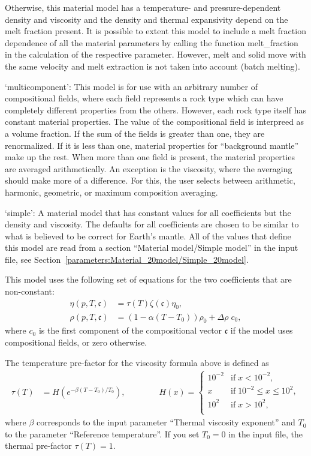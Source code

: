 \begin{itemize}
Otherwise, this material model has a temperature- and pressure-dependent density and viscosity and the density and thermal expansivity depend on the melt fraction present. It is possible to extent this model to include a melt fraction dependence of all the material parameters by calling the function melt_fraction in the calculation of the respective parameter. However, melt and solid move with the same velocity and melt extraction is not taken into account (batch melting). 

`multicomponent': This model is for use with an arbitrary number of compositional fields, where each field represents a rock type which can have completely different properties from the others. However, each rock type itself has constant material properties.  The value of the  compositional field is interpreed as a volume fraction. If the sum of the fields is greater than one, they are renormalized.  If it is less than one, material properties  for ``background mantle'' make up the rest. When more than one field is present, the material properties are averaged arithmetically.  An exception is the viscosity, where the averaging should make more of a difference.  For this, the user selects between arithmetic, harmonic, geometric, or maximum composition averaging.

`simple': A material model that has constant values for all coefficients but the density and viscosity. The defaults for all coefficients are chosen to be similar to what is believed to be correct for Earth's mantle. All of the values that define this model are read from a section ``Material model/Simple model'' in the input file, see Section~\ref{parameters:Material_20model/Simple_20model}.

This model uses the following set of equations for the two coefficients that are non-constant: \begin{align}  \eta(p,T,\mathfrak c) &= \tau(T) \zeta(\mathfrak c) \eta_0, \\  \rho(p,T,\mathfrak c) &= \left(1-\alpha (T-T_0)\right)\rho_0 + \Delta\rho \; c_0,\end{align}where $c_0$ is the first component of the compositional vector $\mathfrak c$ if the model uses compositional fields, or zero otherwise. 

The temperature pre-factor for the viscosity formula above is defined as \begin{align}  \tau(T) &= H\left(e^{-\beta (T-T_0)/T_0}\right),  \qquad\qquad H(x) = \begin{cases}                            10^{-2} & \text{if}\; x<10^{-2}, \\                            x & \text{if}\; 10^{-2}\le x \le 10^2, \\                            10^{2} & \text{if}\; x>10^{2}, \\                         \end{cases}\end{align} where $\beta$ corresponds to the input parameter ``Thermal viscosity exponent'' and $T_0$ to the parameter ``Reference temperature''. If you set $T_0=0$ in the input file, the thermal pre-factor $\tau(T)=1$.


\end{itemize}
